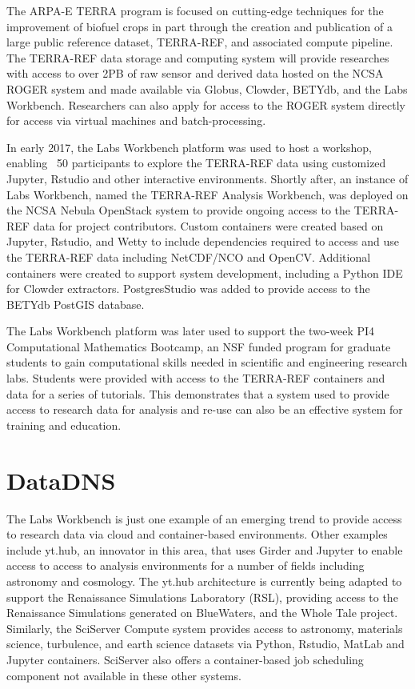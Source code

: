 \documentclass{sig-alternate}
\begin{document}
The ARPA-E TERRA program is focused on cutting-edge techniques for the improvement of biofuel crops in part through the creation and publication of a large public reference dataset, TERRA-REF, and associated compute pipeline. The TERRA-REF data storage and computing system will provide researches with access to over 2PB of raw sensor and derived data hosted on the NCSA ROGER system and made available via Globus, Clowder, BETYdb, and the Labs Workbench. Researchers can also apply for access to the ROGER system directly for access via virtual machines and batch-processing.

In early 2017, the Labs Workbench platform was used to host a workshop, enabling ~50 participants to explore the TERRA-REF data using customized Jupyter, Rstudio and other interactive environments. Shortly after, an instance of Labs Workbench, named the TERRA-REF Analysis Workbench, was deployed on the NCSA Nebula OpenStack system to provide ongoing access to the TERRA-REF data for project contributors. Custom containers were created based on Jupyter, Rstudio, and Wetty to include dependencies required to access and use the TERRA-REF data including NetCDF/NCO and OpenCV.  Additional containers were created to support system development, including a Python IDE for Clowder extractors. PostgresStudio was added to provide access to the BETYdb PostGIS database.

The Labs Workbench platform was later used to support the two-week PI4 Computational Mathematics Bootcamp, an NSF funded program for graduate students to gain computational skills needed in scientific and engineering research labs. Students were provided with access to the TERRA-REF containers and data for a series of tutorials. This demonstrates that a system used to provide access to research data for analysis and re-use can also be an effective system for training and education.

\section{DataDNS}

The Labs Workbench is just one example of an emerging trend to provide access to research data via cloud and container-based environments.  Other examples include yt.hub, an innovator in this area, that uses Girder and Jupyter to enable access to access to analysis environments for a number of fields including astronomy and cosmology.  The yt.hub architecture is currently being adapted to support the Renaissance Simulations Laboratory (RSL), providing access to the Renaissance Simulations generated on BlueWaters, and the Whole Tale project.  Similarly, the SciServer Compute system provides access to astronomy, materials science, turbulence, and earth science datasets via Python, Rstudio, MatLab and Jupyter containers.  SciServer also offers a container-based job scheduling component not available in these other systems.
\end{document}
